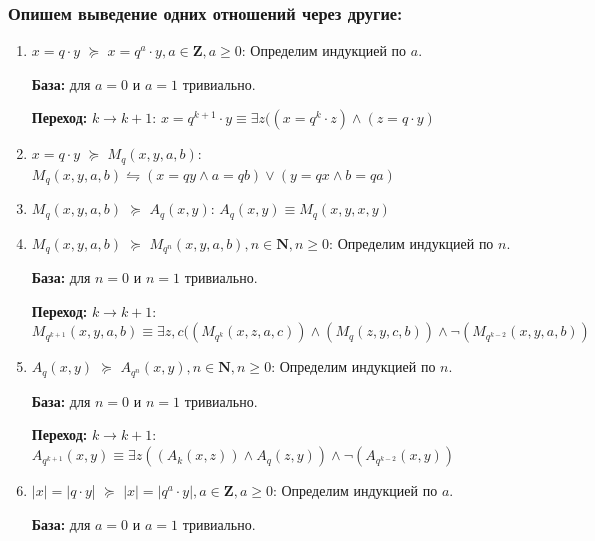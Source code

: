\documentclass[12pt]{article}
\theoremstyle{definition}
\newcommand{\wed}{\wedge} %
\begin{document}
	\subsubsection{Опишем выведение одних отношений через другие:}
	\begin{enumerate}
	    \item $x =q\cdot y$ $\succeq$ $x = q^{a}\cdot y, a \in \textbf{Z}, a \ge 0$:
	    Определим индукцией по $a$. 
	    
	    \textbf{База:} для $a = 0$ и $a = 1$ тривиально.
	    
	    \textbf{Переход:} $k \rightarrow k+1$:
	    $x = q^{k+1}\cdot y \equiv \exists z ((x = q^{k}\cdot z)\wedge (z = q\cdot y)$ 
	    
	    
	    
	    \item $x =q\cdot y$ $\succeq$ $M_{q}(x, y, a, b)$:
	    $ M_{q}(x, y, a, b) \leftrightharpoons (x = qy \wed a = qb) \vee (y = qx \wed b = qa) $
	    
	    
	    \item $M_{q}(x, y, a, b)$ $\succeq$ $A_{q}(x, y)$:
	    $A_{q}(x, y) \equiv M_{q}(x, y, x, y)$
	    
	    \item $M_{q}(x, y, a, b)$ $\succeq$ $M_{q^n}(x, y, a, b), n \in \mathbf{N}, n \ge 0$:
	    Определим индукцией по $n$. 
	    
	    \textbf{База:} для $n = 0$ и $n = 1$ тривиально.
	    
	    \textbf{Переход:} $k \rightarrow k+1$:
	    $M_{q^{k+1}}(x, y, a, b) \equiv \exists z, c ((M_{q^k}(x, z, a, c))\wedge (M_{q}(z, y, c, b)) \wedge \neg (M_{q^{k-2}}(x, y, a, b))$
	    
	    \item $A_{q}(x, y)$ $\succeq$ $A_{q^n}(x, y), n \in \mathbf{N}, n \ge 0$:
	    Определим индукцией по $n$. 
	    
	    \textbf{База:} для $n = 0$ и $n = 1$ тривиально.
	    
	    \textbf{Переход:} $k \rightarrow k+1$:
	    $A_{q^{k+1}}(x, y) \equiv \exists z ((A_{k}(x, z))\wedge A_{q}(z, y)) \wedge \neg (A_{q^{k-2}}(x, y))$
	    
	    
	    
	    
	    \item $|x| =|q\cdot y$| $\succeq$ $|x| = |q^{a}\cdot y|, a \in \textbf{Z}, a \ge 0$:
	    Определим индукцией по $a$. 
	    
	    \textbf{База:} для $a = 0$ и $a = 1$ тривиально.
	    

\end{enumerate}
\end{document}
